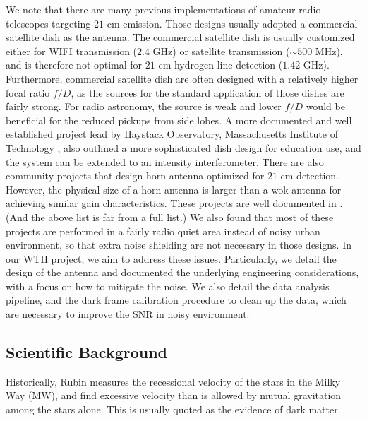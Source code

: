 \documentclass[12pt]{article}
\begin{document}
    We note that there are many previous implementations of amateur radio telescopes targeting $21$ cm emission.
    Those designs usually adopted a commercial satellite dish as the antenna. \cite{amateur-radio-dish-japan, amateur-dish-radio}
    The commercial satellite dish is usually customized either for WIFI transmission ($2.4$ GHz) or satellite transmission ($\sim 500$ MHz), and is therefore not optimal for $21$ cm hydrogen line detection ($1.42$ GHz).
    Furthermore, commercial satellite dish are often designed with a relatively higher focal ratio $f/D$, as the sources for the standard application of those dishes are fairly strong. 
    For radio astronomy, the source is weak and lower $f/D$ would be beneficial for the reduced pickups from side lobes.
    A more documented and well established project lead by Haystack Observatory, Massachusetts Institute of Technology \cite{mit-haystack-srt}, also outlined a more sophisticated dish design for education use, and the system can be extended to an intensity interferometer.
    There are also community projects that design horn antenna optimized for $21$ cm detection. 
    However, the physical size of a horn antenna is larger than a wok antenna for achieving similar gain characteristics.
    These projects are well documented in \cite{amateur-radio-horn-harvard,community-project-doc,physicsOpenLab-project, amateur-radio-horn-ieee, amateur-radio-horn-india}. (And the above list is far from a full list.)
    We also found that most of these projects are performed in a fairly radio quiet area instead of noisy urban environment, so that extra noise shielding are not necessary in those designs. 
    In our WTH project, we aim to address these issues. 
    Particularly, we detail the design of the antenna and documented the underlying engineering considerations, with a focus on how to mitigate the noise. 
    We also detail the data analysis pipeline, and the dark frame calibration procedure to clean up the data, which are necessary to improve the SNR in noisy environment.

    \subsection{Scientific Background}
    Historically, Rubin \cite{rubin-galaxy-rotation-curve} measures the recessional velocity of the stars in the Milky Way (MW), and find excessive velocity than is allowed by mutual gravitation among the stars alone. 
    This is usually quoted as the evidence of dark matter.
    
\end{document}
